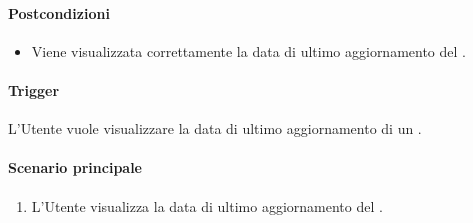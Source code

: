 \paragraph*{Postcondizioni}
\begin{itemize}
  \item Viene visualizzata correttamente la data di ultimo aggiornamento del .
\end{itemize}

\paragraph*{Trigger}
L'Utente vuole visualizzare la data di ultimo aggiornamento di un .

\paragraph*{Scenario principale}
\begin{enumerate}
  \item L'Utente visualizza la data di ultimo aggiornamento del .
\end{enumerate}